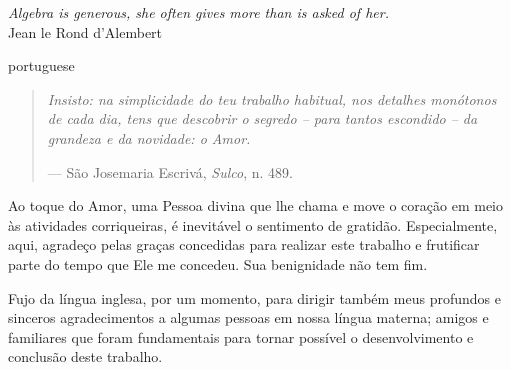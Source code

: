 \documentclass[
	11pt,				%
	openright,			%
	twoside,			%
	a4paper,			%
	french,				%
	brazil,			%
	english				%
	]{abntex2}
\begin{document}


\begin{epigrafe}
    \vspace*{\fill}
    \begin{flushright}
        \textit{Algebra is generous, she often gives more than is asked of her.}\\
        Jean le Rond d'Alembert
    \end{flushright}
\end{epigrafe}

\begin{resumo}[Agradecimentos]
    \begin{otherlanguage*}{portuguese}
        \begin{quotation}
            \itshape
            Insisto: na simplicidade do teu \emph{trabalho habitual}, nos detalhes monótonos de cada dia, tens que descobrir o segredo -- para tantos escondido -- da grandeza e da novidade: o Amor.

            \noindent --- S\~ao Josemaria Escriv\'a, \emph{Sulco}, n. 489.
        \end{quotation}

        \vspace{3em}

        Ao toque do Amor, uma Pessoa divina que lhe chama e move o cora\c c\~ao em meio \`as atividades corriqueiras, \'e inevit\'avel o sentimento de gratid\~ao. Especialmente, aqui, agrade\c co pelas gra\c cas concedidas para realizar este trabalho e frutificar parte do tempo que Ele me concedeu. Sua benignidade n\~ao tem fim.

        Fujo da l\'ingua inglesa, por um momento, para dirigir tamb\'em meus profundos e sinceros agradecimentos a algumas pessoas em nossa l\'ingua materna; amigos e familiares que foram fundamentais para tornar poss\'ivel o desenvolvimento e conclus\~ao deste trabalho.



\end{otherlanguage*}
\end{resumo}
\end{document}
